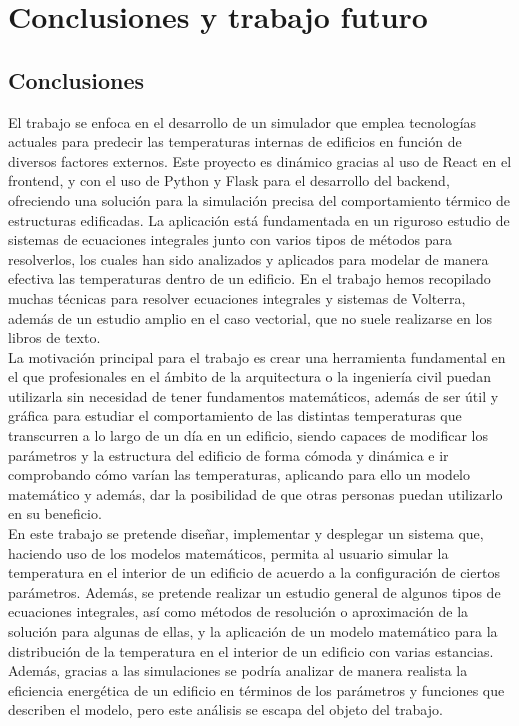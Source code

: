 \chapter{Conclusiones y trabajo futuro}
\section{Conclusiones}
El trabajo se enfoca en el desarrollo de un simulador que emplea tecnologías actuales para predecir las temperaturas internas de edificios en función de diversos factores externos. Este proyecto es dinámico gracias al uso de React en el frontend, y con el uso de Python y Flask para el desarrollo del backend, ofreciendo una solución para la simulación precisa del comportamiento térmico de estructuras edificadas. La aplicación está fundamentada en un riguroso estudio de sistemas de ecuaciones integrales junto con varios tipos de métodos para resolverlos, los cuales han sido analizados y aplicados para modelar de manera efectiva las temperaturas dentro de un edificio. En el trabajo hemos recopilado muchas técnicas para resolver ecuaciones integrales y sistemas de Volterra, además de un estudio amplio en el caso vectorial, que no suele realizarse en los libros de texto. \\

La motivación principal para el trabajo es crear una herramienta fundamental en el que profesionales en el ámbito de la arquitectura o la ingeniería civil puedan utilizarla sin necesidad de tener fundamentos matemáticos, además de ser útil y gráfica para estudiar el comportamiento de las distintas temperaturas que transcurren a lo largo de un día en un edificio, siendo capaces de modificar los parámetros y la estructura del edificio de forma cómoda y dinámica e ir comprobando cómo varían las temperaturas,  aplicando para ello un modelo matemático y además, dar la posibilidad de que otras personas puedan utilizarlo en su beneficio.\\

En este trabajo se pretende diseñar, implementar y desplegar un sistema que, haciendo uso de los modelos matemáticos, permita al usuario simular la temperatura en el interior de un edificio de acuerdo a la configuración de ciertos parámetros. Además, se pretende realizar un estudio general de algunos tipos de ecuaciones integrales, así como métodos de resolución o aproximación de la solución para algunas de ellas, y la aplicación de un modelo matemático para la distribución de la temperatura en el interior de un edificio con varias estancias. Además, gracias a las simulaciones se podría analizar de manera realista la eficiencia energética de un edificio en términos de los parámetros y funciones que describen el modelo, pero este análisis se escapa del objeto del trabajo.\\


